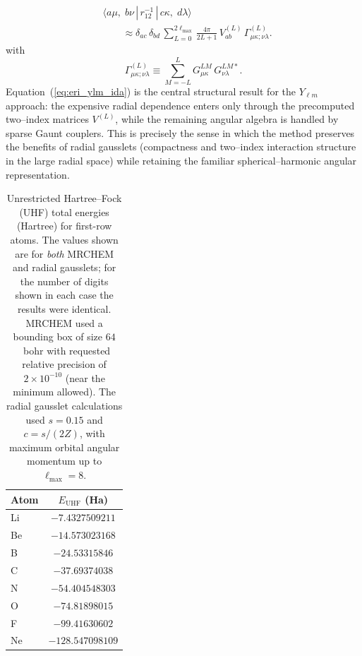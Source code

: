 \documentclass[aps,pra,reprint,longbibliography,nofootinbib]{revtex4-2}
\begin{document}
\begin{equation}
\label{eq:eri_ylm_ida}
\begin{aligned}
&\langle a\mu,\; b\nu \,|\, r_{12}^{-1} \,|\, c\kappa,\; d\lambda\rangle
\\
&\qquad\approx
\delta_{ac}\,\delta_{bd}\,
\sum_{L=0}^{2\ell_{\max}}
\frac{4\pi}{2L+1}\,
V^{(L)}_{ab}\,
\Gamma^{(L)}_{\mu\kappa;\nu\lambda}.
\end{aligned}
\end{equation}
with
\begin{equation}
\Gamma^{(L)}_{\mu\kappa;\nu\lambda}
\equiv
\sum_{M=-L}^{L}
G^{LM}_{\mu\kappa}\,
G^{LM*}_{\nu\lambda}.
\end{equation}
Equation~(\ref{eq:eri_ylm_ida}) is the central structural result for the $Y_{\ell m}$ approach:
the expensive radial dependence enters only through the precomputed two--index matrices $V^{(L)}$,
while the remaining angular algebra is handled by sparse Gaunt couplers.  This is precisely the
sense in which the method preserves the benefits of radial gausslets (compactness and two--index
interaction structure in the large radial space) while retaining the familiar spherical--harmonic
angular representation.



\begin{table}[t]
\centering
\caption{Unrestricted Hartree--Fock (UHF) total energies (Hartree) for first-row atoms.  The values shown are for \emph{both}  MRCHEM and radial gausslets; for the number of digits shown in each case the results were identical. MRCHEM used a bounding box of size $64$~bohr with requested relative precision of $2\times 10^{-10}$ (near the minimum allowed).
The radial gausslet calculations used $s=0.15$ and $c=s/(2Z)$, with maximum orbital angular momentum up to $\ell_{\max}=8$.
}
\label{tab:uhf_mrchem_gausslets_firstrow}
\begin{tabular}{l S[table-format=-3.10]}
\hline
Atom & $E_{\mathrm{UHF}}$ (Ha) \\
\hline
Li  & $-7.4327509211$ \\
Be  & $-14.573023168$ \\
B   & $-24.53315846$ \\
C   & $-37.69374038$ \\
N   & $-54.404548303$ \\
O   & $-74.81898015$ \\
F   & $-99.41630602$ \\
Ne  & $-128.547098109$ \\
\hline
\end{tabular}
\end{table}
\end{document}
